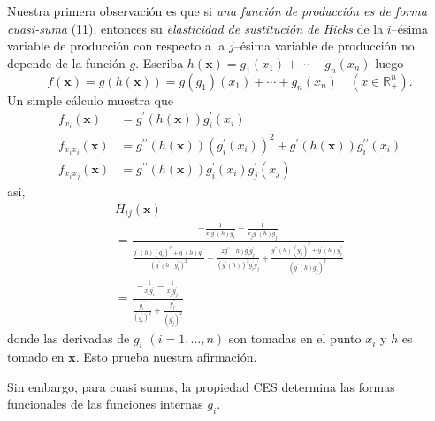 \documentclass[a4paper,fleqn]{cas-dc}
\begin{document}
Nuestra primera observación es que si \emph{una función de producción es de forma cuasi-suma} (11), entonces su \emph{elasticidad de sustitución de Hicks} de la $i$--ésima variable de producción con respecto a la $j$--ésima variable de producción no depende de la función $g$. Escriba $h\left(\bm{x}\right)=g_{1}\left(x_{1}\right)+\cdots+g_{n}\left(x_{n}\right)$ luego \[ f\left(\bm{x}\right)=g\left(h\left(\bm{x}\right)\right)=g\left(g_{1}\right)\left(x_{1}\right)+\cdots+g_{n}\left(x_{n}\right)\quad\left(x\in\mathds{R}^{n}_{+}\right). \] Un simple cálculo muestra que
\begin{align*}
f_{x_{i}}\left(\bm{x}\right)
&=g^{\prime}\left(h\left(\bm{x}\right)\right)g^{\prime}_{i}\left(x_{i}\right)\\
f_{x_{i}x_{i}}\left(\bm{x}\right)
&=g^{\prime\prime}\left(h\left(\bm{x}\right)\right){\left(g^{\prime}_{i}\left(x_{i}\right)\right)}^{2}+g^{\prime}\left(h\left(\bm{x}\right)\right)g^{\prime\prime}_{i}\left(x_{i}\right)\\
f_{x_{i}x_{j}}\left(\bm{x}\right)
&=g^{\prime\prime}\left(h\left(\bm{x}\right)\right)g^{\prime}_{i}\left(x_{i}\right)g^{\prime}_{j}\left(x_{j}\right)
\end{align*}
así,
\begin{multline}
H_{ij}\left(\bm{x}\right)\\
=\frac{-\frac{1}{x_{i}g^{\prime}\left(h\right)g^{\prime}_{i}}-\frac{1}{x_{j}g^{\prime}\left(h\right)g^{\prime}_{j}}}
{\frac{g^{\prime\prime}\left(h\right){\left(g^{\prime}_{i}\right)}^{2}+g^{\prime}\left(h\right)g^{\prime\prime}_{i}}{{\left(g^{\prime}\left(h\right)g^{\prime}_{i}\right)}^{2}}-\frac{2g^{\prime\prime}\left(h\right)g^{\prime}_{i}g^{\prime}_{j}}{{\left(g^{\prime}\left(h\right)\right)}^{2}g^{\prime}_{i}g^{\prime}_{j}}+\frac{g^{\prime\prime}\left(h\right){\left(g^{\prime}_{j}\right)}^{2}+g^{\prime}\left(h\right)g^{\prime\prime}_{j}}{{\left(g^{\prime}\left(h\right)g^{\prime}_{j}\right)}^{2}}}\\
=\frac{-\frac{1}{x_{i}g^{\prime}_{i}}-\frac{1}{x_{j}g^{\prime}_{j}}}{\frac{g^{\prime\prime}_{i}}{{\left(g^{\prime}_{i}\right)}^{2}}+\frac{g^{\prime\prime}_{j}}{{\left(g^{\prime}_{j}\right)}^{2}}}
\end{multline}
donde las derivadas de $g_{i}$ $(i=1,\ldots,n)$ son tomadas en el punto $x_{i}$ y $h$ es tomado en $\bm{x}$. Esto prueba nuestra afirmación.

Sin embargo, para cuasi sumas, la propiedad CES determina las formas funcionales de las funciones internas $g_{i}$.
\end{document}
